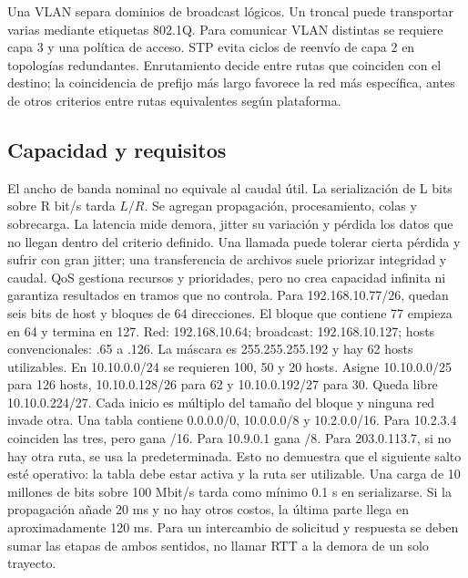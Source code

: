 Una VLAN separa dominios de broadcast lógicos. Un troncal puede transportar varias mediante etiquetas 802.1Q. Para comunicar VLAN distintas se requiere capa 3 y una política de acceso. STP evita ciclos de reenvío de capa 2 en topologías redundantes. Enrutamiento decide entre rutas que coinciden con el destino; la coincidencia de prefijo más largo favorece la red más específica, antes de otros criterios entre rutas equivalentes según plataforma.

\subsection{Capacidad y requisitos}
El ancho de banda nominal no equivale al caudal útil. La serialización de L bits sobre R bit/s tarda $L/R$. Se agregan propagación, procesamiento, colas y sobrecarga. La latencia mide demora, jitter su variación y pérdida los datos que no llegan dentro del criterio definido. Una llamada puede tolerar cierta pérdida y sufrir con gran jitter; una transferencia de archivos suele priorizar integridad y caudal. QoS gestiona recursos y prioridades, pero no crea capacidad infinita ni garantiza resultados en tramos que no controla.
Para 192.168.10.77/26, quedan seis bits de host y bloques de 64 direcciones. El bloque que contiene 77 empieza en 64 y termina en 127. Red: 192.168.10.64; broadcast: 192.168.10.127; hosts convencionales: .65 a .126. La máscara es 255.255.255.192 y hay 62 hosts utilizables.
En 10.10.0.0/24 se requieren 100, 50 y 20 hosts. Asigne 10.10.0.0/25 para 126 hosts, 10.10.0.128/26 para 62 y 10.10.0.192/27 para 30. Queda libre 10.10.0.224/27. Cada inicio es múltiplo del tamaño del bloque y ninguna red invade otra.
Una tabla contiene 0.0.0.0/0, 10.0.0.0/8 y 10.2.0.0/16. Para 10.2.3.4 coinciden las tres, pero gana /16. Para 10.9.0.1 gana /8. Para 203.0.113.7, si no hay otra ruta, se usa la predeterminada. Esto no demuestra que el siguiente salto esté operativo: la tabla debe estar activa y la ruta ser utilizable.
Una carga de 10 millones de bits sobre 100 Mbit/s tarda como mínimo 0.1 s en serializarse. Si la propagación añade 20 ms y no hay otros costos, la última parte llega en aproximadamente 120 ms. Para un intercambio de solicitud y respuesta se deben sumar las etapas de ambos sentidos, no llamar RTT a la demora de un solo trayecto.

